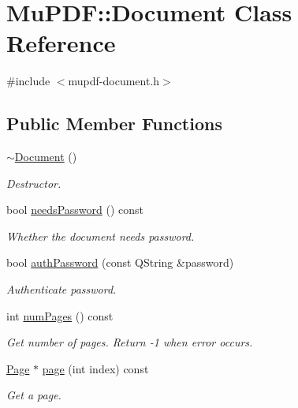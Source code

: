 \hypertarget{class_mu_p_d_f_1_1_document}{\section{Mu\-P\-D\-F\-:\-:Document Class Reference}
\label{class_mu_p_d_f_1_1_document}
}


{\ttfamily \#include $<$mupdf-\/document.\-h$>$}

\subsection*{Public Member Functions}
\begin{DoxyCompactItemize}
\item 
\hyperlink{class_mu_p_d_f_1_1_document_a5fc2b6668a9809a9e97fc84d1820117b}{$\sim$\-Document} ()
\begin{DoxyCompactList}\small\item\em Destructor. \end{DoxyCompactList}\item 
bool \hyperlink{class_mu_p_d_f_1_1_document_a1a13ec739fa4ead2caeb317c433c1756}{needs\-Password} () const 
\begin{DoxyCompactList}\small\item\em Whether the document needs password. \end{DoxyCompactList}\item 
bool \hyperlink{class_mu_p_d_f_1_1_document_a5d447dc019e82e7d6c55ee3d55a1a496}{auth\-Password} (const Q\-String \&password)
\begin{DoxyCompactList}\small\item\em Authenticate password. \end{DoxyCompactList}\item 
int \hyperlink{class_mu_p_d_f_1_1_document_aa45c6ede18c2d65cd151ba2759732c60}{num\-Pages} () const 
\begin{DoxyCompactList}\small\item\em Get number of pages. Return -\/1 when error occurs. \end{DoxyCompactList}\item 
\hyperlink{class_mu_p_d_f_1_1_page}{Page} $\ast$ \hyperlink{class_mu_p_d_f_1_1_document_ab54358660c0054f821728d32fa9fb1ad}{page} (int index) const 
\begin{DoxyCompactList}\small\item\em Get a page. \end{DoxyCompactList}\item 

\end{DoxyCompactItemize}
